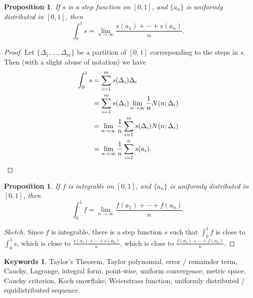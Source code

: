 \documentclass[12pt]{article}
\theoremstyle{plain}
\newtheorem{proposition}[theorem]{Proposition}
\theoremstyle{definition}
\newtheorem*{keywords}{Keywords}
\theoremstyle{remark}
\begin{document}
\begin{proposition}
If $s$ is a step function on $[0, 1]$, and $\{a_n\}$ is uniformly distributed in $[0, 1]$, then $$\int_0^1 s = \lim_{n\to\infty} \frac{s(a_1) + \cdots + s(a_n)}{n}.$$
\end{proposition}

\begin{proof}
Let $\{\Delta_1, \ldots, \Delta_m\}$ be a partition of $[0, 1]$ corresponding to the steps in $s.$ Then (with a slight abuse of notation) we have 
\begin{align*}
\int_0^1 s &= \sum_{i=1}^m s(\Delta_i) \Delta_i \\
&= \sum_{i=1}^m s(\Delta_i) \lim_{n \to \infty} \frac{1}{n} N(n; \Delta_i) \\
&= \lim_{n \to \infty} \frac{1}{n} \sum_{i=1}^m s(\Delta_i) N(n; \Delta_i) \\
&= \lim_{n \to \infty} \frac{1}{n} \sum_{i=1}^n s(a_i).\qedhere
\end{align*}
\end{proof}

\begin{proposition}
If $f$ is integrable on $[0, 1]$, and $\{a_n\}$ is uniformly distributed in $[0, 1]$, then $$\int_0^1 f = \lim_{n\to\infty} \frac{f(a_1) + \cdots + f(a_n)}{n}.$$
\end{proposition}

\begin{proof}[Sketch]
Since $f$ is integrable, there is a step function $s$ such that $\int_0^1 f$ is close to $\int_0^1 s$, which is close to $\frac{s(a_1) + \cdots + s(a_n)}{n}$, which is close to $\frac{f(a_1) + \cdots + f(a_n)}{n}$.
\end{proof}

\begin{keywords}
Taylor's Theorem, Taylor polynomial, error / remainder term, Cauchy, Lagrange, integral form, point-wise, uniform convergence, metric space, Cauchy criterion, Koch snowflake, Weierstrass function, uniformly distributed / equidistributed sequence.
\end{keywords}
\end{document}
